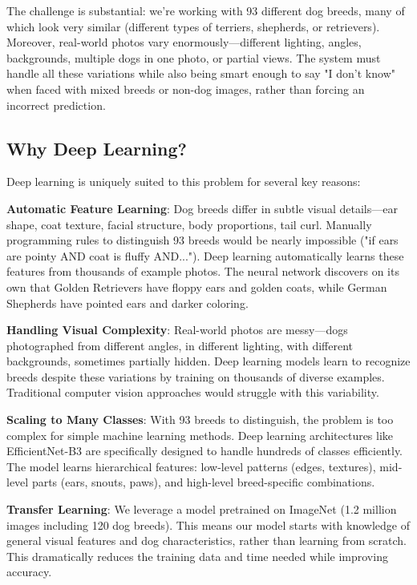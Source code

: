 \documentclass[final]{article}
\begin{document}
The challenge is substantial: we're working with 93 different dog breeds, many of which look very similar (different types of terriers, shepherds, or retrievers). Moreover, real-world photos vary enormously—different lighting, angles, backgrounds, multiple dogs in one photo, or partial views. The system must handle all these variations while also being smart enough to say "I don't know" when faced with mixed breeds or non-dog images, rather than forcing an incorrect prediction.

\subsection*{Why Deep Learning?}

Deep learning is uniquely suited to this problem for several key reasons:

\textbf{Automatic Feature Learning}: Dog breeds differ in subtle visual details—ear shape, coat texture, facial structure, body proportions, tail curl. Manually programming rules to distinguish 93 breeds would be nearly impossible ("if ears are pointy AND coat is fluffy AND..."). Deep learning automatically learns these features from thousands of example photos. The neural network discovers on its own that Golden Retrievers have floppy ears and golden coats, while German Shepherds have pointed ears and darker coloring.

\textbf{Handling Visual Complexity}: Real-world photos are messy—dogs photographed from different angles, in different lighting, with different backgrounds, sometimes partially hidden. Deep learning models learn to recognize breeds despite these variations by training on thousands of diverse examples. Traditional computer vision approaches would struggle with this variability.

\textbf{Scaling to Many Classes}: With 93 breeds to distinguish, the problem is too complex for simple machine learning methods. Deep learning architectures like EfficientNet-B3 are specifically designed to handle hundreds of classes efficiently. The model learns hierarchical features: low-level patterns (edges, textures), mid-level parts (ears, snouts, paws), and high-level breed-specific combinations.

\textbf{Transfer Learning}: We leverage a model pretrained on ImageNet (1.2 million images including 120 dog breeds). This means our model starts with knowledge of general visual features and dog characteristics, rather than learning from scratch. This dramatically reduces the training data and time needed while improving accuracy.
\end{document}
